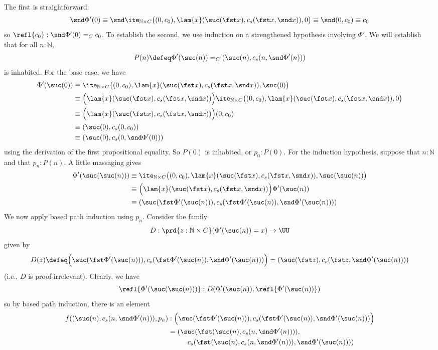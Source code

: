 The first is straightforward:
\[
\snd \Phi'(0)
\equiv
\snd\ite_{\mathbb{N} \times C}\big(
(0, c_{0}),
\lam{x}(\suc(\fst x), c_{s}(\fst x, \snd x)),
0
\big)
\equiv
\snd(0, c_{0})
\equiv
c_{0}
\]
so $\refl{c_{0}} : \snd\Phi'(0) =_{C} c_{0}$.  To establish the second, we use
induction on a strengthened hypothesis involving $\Phi'$.  We will establish
that for all $n : \mathbb{N}$,
\[
  P(n) \defeq 
  \Phi'(\suc(n)) =_{C} (\suc(n), c_{s}(n, \snd\Phi'(n)))
\]
is inhabited.
For the base case, we have
\begin{align*}
\Phi'(\suc(0)) &\equiv 
\ite_{\mathbb{N} \times C}\big(
(0, c_{0}),
\lam{x}(\suc(\fst x), c_{s}(\fst x, \snd x)),
\suc(0)
\big)
\\&\equiv
\Big(\lam{x}(\suc(\fst x), c_{s}(\fst x, \snd x))\Big)
\ite_{\mathbb{N} \times C}\big(
(0, c_{0}),
\lam{x}(\suc(\fst x), c_{s}(\fst x, \snd x)),
0
\big)
\\&\equiv
\Big(\lam{x}(\suc(\fst x), c_{s}(\fst x, \snd x))\Big)
(0, c_{0})
\\&\equiv
(\suc(0), c_{s}(0, c_{0}))
\\&\equiv
(\suc(0), c_{s}(0, \snd\Phi'(0)))
\end{align*}
using the derivation of the first propositional equality.  So $P(0)$ is
inhabited, or $p_{0} : P(0)$.  For the induction
hypothesis, suppose that $n : \mathbb{N}$ and that $p_{n} : P(n)$.  A little
massaging gives
\begin{align*}
  \Phi'(\suc(\suc(n)))
  &\equiv
   \ite_{\mathbb{N} \times C}\big(
     (0, c_{0}),
     \lam{x}(\suc(\fst x), c_{s}(\fst x, \snd x)),
     \suc(\suc(n))
   \big)
   \\&\equiv
   \Big(\lam{x}(\suc(\fst x), c_{s}(\fst x, \snd x))\Big) \Phi'(\suc(n))
   \\&\equiv
   (\suc(\fst \Phi'(\suc(n))), c_{s}(\fst \Phi'(\suc(n)), \snd \Phi'(\suc(n)))) 
\end{align*}
We now apply based path induction using $p_{n}$.  Consider the family
\[
  D : \prd{z:\mathbb{N} \times C}(\Phi'(\suc(n)) = x) \to \UU
\]
given by
\[
D(z) \defeq 
\Big(\suc(\fst \Phi'(\suc(n))), c_{s}(\fst \Phi'(\suc(n)), \snd
\Phi'(\suc(n)))\Big) 
=
(\suc(\fst z), c_{s}(\fst z, \snd \Phi'(\suc(n)))) 
\]
(i.e., $D$ is proof-irrelevant).
Clearly, we have
\[
\refl{\Phi'(\suc(\suc(n)))} : D(\Phi'(\suc(n)), \refl{\Phi'(\suc(n))})
\]
so by based path induction, there is an element
\begin{align*}
  f((\suc(n), c_{s}(n, \snd\Phi'(n))), p_{n}) &:
\Big(\suc(\fst \Phi'(\suc(n))), c_{s}(\fst \Phi'(\suc(n)), \snd
\Phi'(\suc(n)))\Big) 
\\&=
(\suc(\fst (\suc(n), c_{s}(n, \snd\Phi'(n)))),
\\&\phantom{---}
c_{s}(\fst (\suc(n), c_{s}(n,
\snd\Phi'(n))), \snd\Phi'(\suc(n)))) 
\end{align*}
